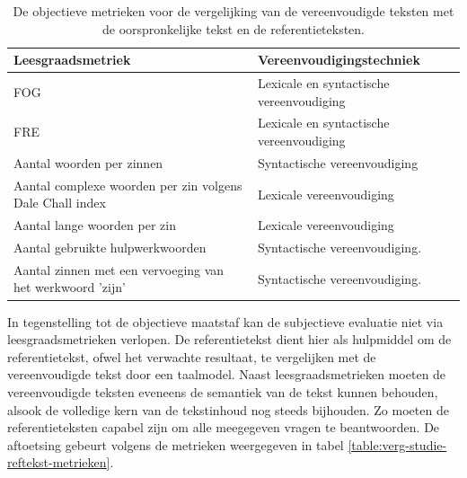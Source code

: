 \begin{center}
	\begin{table}[H]
		\begin{tabular}{ | m{8cm} | m{7cm} | } 
			\hline
			\textbf{Leesgraadsmetriek} & \textbf{Vereenvoudigingstechniek }\\
			\hline
			FOG & Lexicale en syntactische vereenvoudiging \\
			\hline
			FRE & Lexicale en syntactische vereenvoudiging \\
			\hline
			Aantal woorden per zinnen & Syntactische vereenvoudiging \\
			\hline
			Aantal complexe woorden per zin volgens Dale Chall index & Lexicale vereenvoudiging \\
			\hline
			Aantal lange woorden per zin & Lexicale vereenvoudiging \\
			\hline
			Aantal gebruikte hulpwerkwoorden & Syntactische vereenvoudiging. \\
			\hline
			Aantal zinnen met een vervoeging van het werkwoord 'zijn' & Syntactische vereenvoudiging. \\
			\hline
		\end{tabular}
		\caption{De objectieve metrieken voor de vergelijking van de vereenvoudigde teksten met de oorspronkelijke tekst en de referentieteksten.}
		\label{table:verg-studie-metrieken}
	\end{table}
\end{center}

%
In tegenstelling tot de objectieve maatstaf kan de subjectieve evaluatie niet via leesgraadsmetrieken verlopen. De referentietekst dient hier als hulpmiddel om de referentietekst, ofwel het verwachte resultaat, te vergelijken met de vereenvoudigde tekst door een taalmodel. Naast leesgraadsmetrieken moeten de vereenvoudigde teksten eveneens de semantiek van de tekst kunnen behouden, alsook de volledige kern van de tekstinhoud nog steeds bijhouden. Zo moeten de referentieteksten capabel zijn om alle meegegeven vragen te beantwoorden. De aftoetsing gebeurt volgens de metrieken weergegeven in tabel \ref{table:verg-studie-reftekst-metrieken}.

